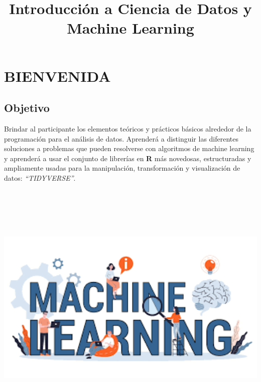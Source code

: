 \documentclass[
]{book}
\title{Introducción a Ciencia de Datos y Machine Learning}
\author{}
\date{\vspace{-2.5em}}
\begin{document}
\maketitle

{
\setcounter{tocdepth}{1}
\tableofcontents
}
\hypertarget{bienvenida}{%
\chapter*{BIENVENIDA}\label{bienvenida}}

\hypertarget{objetivo}{%
\section*{Objetivo}\label{objetivo}}

Brindar al participante los elementos teóricos y prácticos básicos alrededor de la programación para el análisis de datos. Aprenderá a distinguir las diferentes soluciones a problemas que pueden resolverse con algoritmos de machine learning y aprenderá a usar el conjunto de librerías en \textbf{R} más novedosas, estructuradas y ampliamente usadas para la manipulación, transformación y visualización de datos: \emph{``TIDYVERSE''}.

\begin{center}\includegraphics[width=600pt,height=350pt]{img/00-presentacion/machine-learning2} \end{center}
\end{document}
